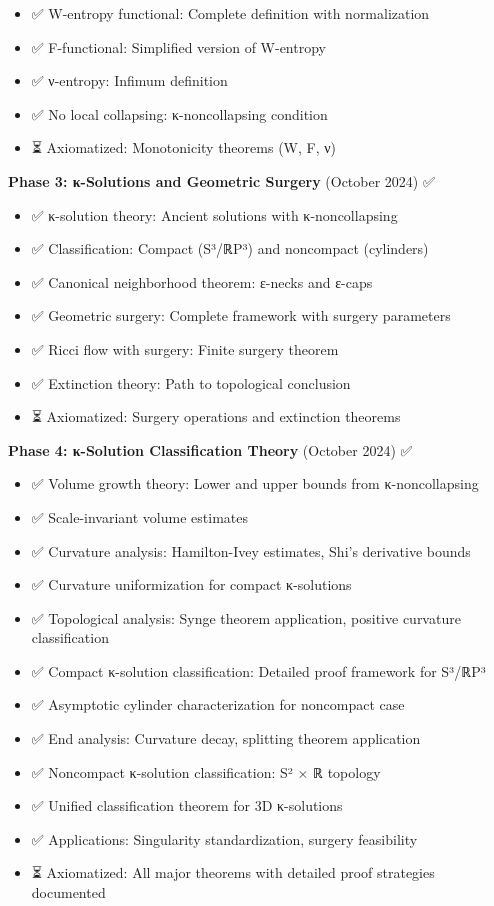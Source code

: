 \begin{itemize}
\item ✅ W-entropy functional: Complete definition with normalization
\item ✅ F-functional: Simplified version of W-entropy
\item ✅ ν-entropy: Infimum definition
\item ✅ No local collapsing: κ-noncollapsing condition
\item ⏳ Axiomatized: Monotonicity theorems (W, F, ν)
\end{itemize}

\textbf{Phase 3: κ-Solutions and Geometric Surgery} (October 2024) ✅

\begin{itemize}
\item ✅ κ-solution theory: Ancient solutions with κ-noncollapsing
\item ✅ Classification: Compact (S³/ℝP³) and noncompact (cylinders)
\item ✅ Canonical neighborhood theorem: ε-necks and ε-caps
\item ✅ Geometric surgery: Complete framework with surgery parameters
\item ✅ Ricci flow with surgery: Finite surgery theorem
\item ✅ Extinction theory: Path to topological conclusion
\item ⏳ Axiomatized: Surgery operations and extinction theorems
\end{itemize}

\textbf{Phase 4: κ-Solution Classification Theory} (October 2024) ✅

\begin{itemize}
\item ✅ Volume growth theory: Lower and upper bounds from κ-noncollapsing
\item ✅ Scale-invariant volume estimates
\item ✅ Curvature analysis: Hamilton-Ivey estimates, Shi's derivative bounds
\item ✅ Curvature uniformization for compact κ-solutions
\item ✅ Topological analysis: Synge theorem application, positive curvature classification
\item ✅ Compact κ-solution classification: Detailed proof framework for S³/ℝP³
\item ✅ Asymptotic cylinder characterization for noncompact case
\item ✅ End analysis: Curvature decay, splitting theorem application
\item ✅ Noncompact κ-solution classification: S² × ℝ topology
\item ✅ Unified classification theorem for 3D κ-solutions
\item ✅ Applications: Singularity standardization, surgery feasibility
\item ⏳ Axiomatized: All major theorems with detailed proof strategies documented
\end{itemize}

